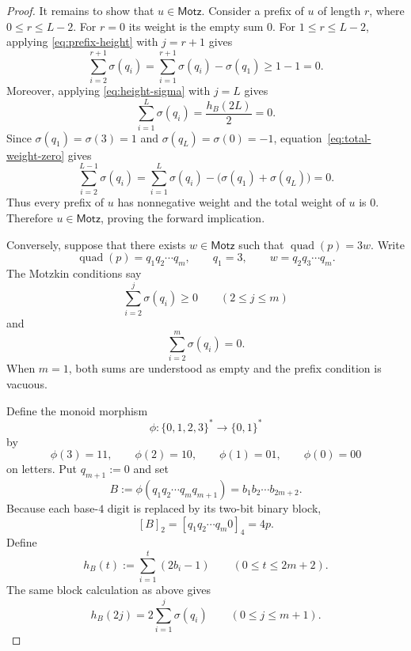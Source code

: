 \documentclass[12pt]{article}
\theoremstyle{plain}
\theoremstyle{definition}
\theoremstyle{plain}
\begin{document}
\begin{proof}
It remains to show that $u\in\mathsf{Motz}$.  Consider a prefix of $u$ of
length $r$, where $0\leq r\leq L-2$.  For $r=0$ its weight is the empty sum
$0$.  For $1\leq r\leq L-2$, applying \eqref{eq:prefix-height} with
$j=r+1$ gives
\begin{equation}\label{eq:motzkin-prefix-nonnegative}
 \sum_{i=2}^{r+1}\sigma(q_i)
 =\sum_{i=1}^{r+1}\sigma(q_i)-\sigma(q_1)
 \geq1-1=0.
\end{equation}
Moreover, applying \eqref{eq:height-sigma} with $j=L$ gives
\begin{equation}\label{eq:total-weight-zero}
 \sum_{i=1}^{L}\sigma(q_i)
 =\frac{h_B(2L)}{2}
 =0.
\end{equation}
Since $\sigma(q_1)=\sigma(3)=1$ and
$\sigma(q_L)=\sigma(0)=-1$, equation~\eqref{eq:total-weight-zero} gives
\[
 \sum_{i=2}^{L-1}\sigma(q_i)
 =\sum_{i=1}^{L}\sigma(q_i)
  -\bigl(\sigma(q_1)+\sigma(q_L)\bigr)
 =0.
\]
Thus every prefix of $u$ has nonnegative weight and the total weight of $u$
is $0$.  Therefore $u\in\mathsf{Motz}$, proving the forward implication.

Conversely, suppose that there exists $w\in\mathsf{Motz}$ such that
$\operatorname{quad}(p)=3w$.  Write
\[
 \operatorname{quad}(p)=q_1q_2\cdots q_m,
 \qquad
 q_1=3,
 \qquad
 w=q_2q_3\cdots q_m.
\]
The Motzkin conditions say
\begin{equation}\label{eq:reverse-motzkin-prefix}
 \sum_{i=2}^{j}\sigma(q_i)\geq0
 \qquad(2\leq j\leq m)
\end{equation}
and
\begin{equation}\label{eq:reverse-motzkin-total}
 \sum_{i=2}^{m}\sigma(q_i)=0.
\end{equation}
When $m=1$, both sums are understood as empty and the prefix condition is
vacuous.

Define the monoid morphism
\[
 \phi:\{0,1,2,3\}^*\longrightarrow\{0,1\}^*
\]
by
\[
 \phi(3)=11,\qquad
 \phi(2)=10,\qquad
 \phi(1)=01,\qquad
 \phi(0)=00
\]
on letters.  Put $q_{m+1}:=0$ and set
\[
 B:=\phi(q_1q_2\cdots q_mq_{m+1})
   =b_1b_2\cdots b_{2m+2}.
\]
Because each base-$4$ digit is replaced by its two-bit binary block,
\begin{equation}\label{eq:block-value}
 [B]_2=[q_1q_2\cdots q_m0]_4=4p.
\end{equation}
Define
\[
 h_B(t):=\sum_{i=1}^{t}(2b_i-1)
 \qquad(0\leq t\leq2m+2).
\]
The same block calculation as above gives
\begin{equation}\label{eq:reverse-height-sigma}
 h_B(2j)=2\sum_{i=1}^{j}\sigma(q_i)
 \qquad(0\leq j\leq m+1).
\end{equation}


\end{proof}
\end{document}
